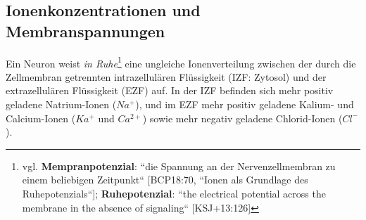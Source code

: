 \subsection{Ionenkonzentrationen und Membranspannungen}\label{sec-ionenkonzentrationen}

Ein Neuron weist \textit{in Ruhe}\footnote{
 vgl. \textbf{Mempranpotenzial}: ``die Spannung an der Nervenzellmembran zu einem beliebigen Zeitpunkt`` {[BCP18:70, ``Ionen als Grundlage des Ruhepotenzials``]}; \textbf{Ruhepotenzial}: ``the electrical potential across the membrane in the absence of signaling`` {[KSJ+13:126]}
} eine ungleiche Ionenverteilung zwischen der durch die Zellmembran getrennten intrazellulären Flüssigkeit (IZF: Zytosol) und der extrazellulären Flüssigkeit (EZF) auf.
In der IZF befinden sich mehr positiv geladene Natrium-Ionen ($Na^+$), und im EZF mehr positiv geladene Kalium- und Calcium-Ionen ($Ka^+$ und $Ca^{2+}$) sowie mehr negativ geladene Chlorid-Ionen ($Cl^-$).


